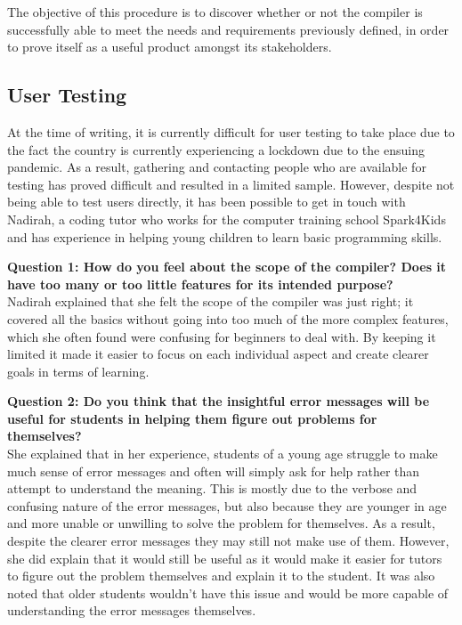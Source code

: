 \documentclass[
]{report}
\begin{document}
The objective of this procedure is to discover whether or not the
compiler is successfully able to meet the needs and requirements
previously defined, in order to prove itself as a useful product amongst
its stakeholders.

\subsection{User Testing}
At the time of writing, it is currently difficult for user testing to
take place due to the fact the country is currently experiencing a
lockdown due to the ensuing pandemic. As a result, gathering and
contacting people who are available for testing has proved difficult and
resulted in a limited sample. However, despite not being able to test
users directly, it has been possible to get in touch with Nadirah, a
coding tutor who works for the computer training school Spark4Kids and
has experience in helping young children to learn basic programming
skills.

\textbf{Question 1: How do you feel about the scope of the compiler?
Does it have too many or too little features for its intended
purpose?}\\
Nadirah explained that she felt the scope of the compiler was just right;
it covered all the basics without going into too much of the more
complex features, which she often found were confusing for beginners to
deal with. By keeping it limited it made it easier to focus on each
individual aspect and create clearer goals in terms of learning.

\textbf{Question 2: Do you think that the insightful error messages will
be useful for students in helping them figure out problems for
themselves?}\\
She explained that in her experience, students of a young age struggle
to make much sense of error messages and often will simply ask for help
rather than attempt to understand the meaning. This is mostly due to the
verbose and confusing nature of the error messages, but also because
they are younger in age and more unable or unwilling to solve the
problem for themselves. As a result, despite the clearer error messages
they may still not make use of them. However, she did explain that it
would still be useful as it would make it easier for tutors to figure
out the problem themselves and explain it to the student. It was also
noted that older students wouldn't have this issue and would be more
capable of understanding the error messages themselves.
\end{document}
